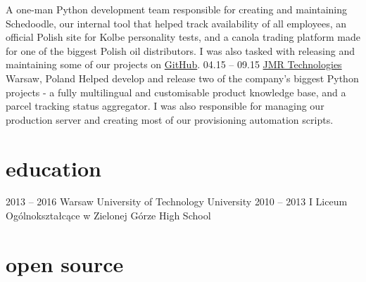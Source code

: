 \documentclass[]{cv-style}  %
\begin{document}
\begin{entrylist}
  {A one-man Python development team responsible for creating and maintaining Schedoodle, our internal tool that helped track availability of all employees, an official Polish site for Kolbe personality tests, and a canola trading platform made for one of the biggest Polish oil distributors. I was also tasked with releasing and maintaining some of our projects on \href{https://github.com/Pythonity}{GitHub}.}
\entry
  {04.15 -- 09.15}
  {\href{https://jmr.pl/}{JMR Technologies}}
  {Warsaw, Poland}
  {Helped develop and release two of the company's biggest Python projects - a fully multilingual and customisable product knowledge base, and a parcel tracking status aggregator. I was also responsible for managing our production server and creating most of our provisioning automation scripts.}
\end{entrylist}

\vspace{-0.3cm}


\section{education}
  \vspace{-0.3cm}

\begin{entrylist}
\entry
  {2013 -- 2016}
  {Warsaw University of Technology}
  {University}
  {}
\entry
  {2010 -- 2013}
  {I Liceum Ogólnokształcące w Zielonej Górze}
  {High School}
  {}
\end{entrylist}

\vspace{-0.6cm}


\section{open source}
  \vspace{-0.25cm}
\end{document}
